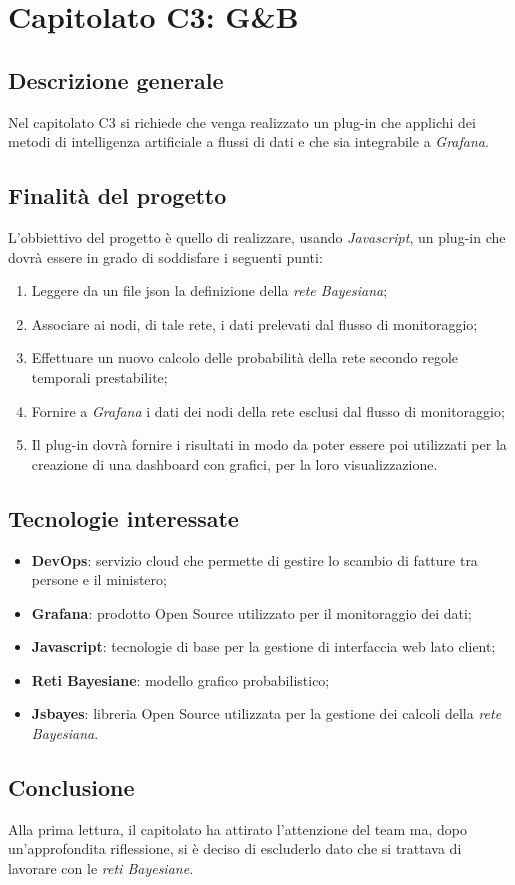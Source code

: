 \chapter{Capitolato C3: G\&B}
\section{Descrizione generale}
Nel capitolato C3 si richiede che venga realizzato un plug-in che applichi dei metodi di intelligenza artificiale a flussi di dati e che sia integrabile a \emph{Grafana}.
\section{Finalit\`a del progetto}
L'obbiettivo del progetto è quello di realizzare, usando \emph{Javascript}, un plug-in che dovrà essere in grado di soddisfare i seguenti punti:
\begin{enumerate}
	\item Leggere da un file json la definizione della \emph{rete Bayesiana};
	\item Associare ai nodi, di tale rete, i dati prelevati dal flusso di monitoraggio;
	\item Effettuare un nuovo calcolo delle probabilit\`a della rete secondo regole temporali prestabilite;
	\item Fornire a \emph{Grafana} i dati dei nodi della rete esclusi dal flusso di monitoraggio;
	\item Il plug-in dovrà fornire i risultati in modo da poter essere poi utilizzati per la creazione di una dashboard con grafici, per la loro visualizzazione. 
\end{enumerate}
\section{Tecnologie interessate}
\begin{itemize}
	\item \textbf{DevOps}: servizio cloud che permette di gestire lo scambio di fatture tra persone e il ministero;
	\item \textbf{Grafana}: prodotto Open Source utilizzato per il monitoraggio dei dati;
	\item \textbf{Javascript}: tecnologie di base per la gestione di interfaccia web lato client;
	\item \textbf{Reti Bayesiane}: modello grafico probabilistico;
	\item \textbf{Jsbayes}: libreria Open Source utilizzata per la gestione dei calcoli della \emph{rete Bayesiana}.
\end{itemize}
\section{Conclusione}
Alla prima lettura, il capitolato ha attirato l'attenzione del team ma, dopo un'approfondita riflessione, si è deciso di escluderlo dato che si trattava di lavorare con le \emph{reti Bayesiane}.